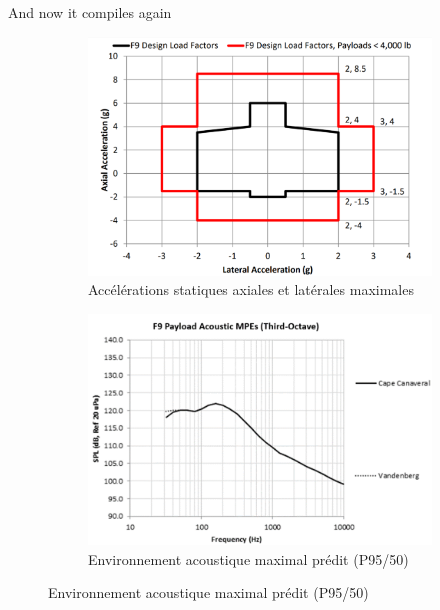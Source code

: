 
And now it compiles again 

\begin{figure}[h] %
     \centering
     \begin{subfigure}[]{0.48\textwidth}
         \centering
         \includegraphics[width=\textwidth]{Img/falcon_static.png}
         \caption{Accélérations statiques axiales et latérales maximales}
         \label{fig:falcon9_static}
     \end{subfigure}
     \hfill
     \begin{subfigure}[]{0.48\textwidth}
         \centering
         \includegraphics[width=\textwidth]{Img/falcon_acoustic.png}
         \caption{Environnement acoustique maximal prédit (P95/50)}

\end{subfigure}
\end{figure}
